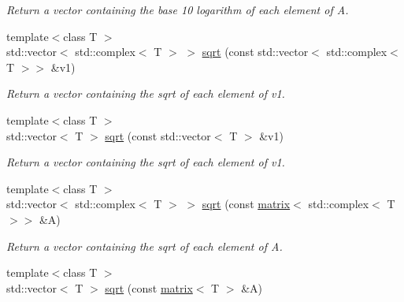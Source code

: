 \begin{DoxyCompactItemize}
\begin{DoxyCompactList}\small\item\em Return a vector containing the base 10 logarithm of each element of A. \end{DoxyCompactList}\item 
\hypertarget{namespacekeycpp_a24d916a516c57aad0e383ce29a50b963}{{\footnotesize template$<$class T $>$ }\\std\-::vector$<$ std\-::complex$<$ T $>$ $>$ \hyperlink{namespacekeycpp_a24d916a516c57aad0e383ce29a50b963}{sqrt} (const std\-::vector$<$ std\-::complex$<$ T $>$$>$ \&v1)}\label{namespacekeycpp_a24d916a516c57aad0e383ce29a50b963}

\begin{DoxyCompactList}\small\item\em Return a vector containing the sqrt of each element of v1. \end{DoxyCompactList}\item 
\hypertarget{namespacekeycpp_a8677ad8b7dc8485540330a632cb82994}{{\footnotesize template$<$class T $>$ }\\std\-::vector$<$ T $>$ \hyperlink{namespacekeycpp_a8677ad8b7dc8485540330a632cb82994}{sqrt} (const std\-::vector$<$ T $>$ \&v1)}\label{namespacekeycpp_a8677ad8b7dc8485540330a632cb82994}

\begin{DoxyCompactList}\small\item\em Return a vector containing the sqrt of each element of v1. \end{DoxyCompactList}\item 
\hypertarget{namespacekeycpp_a2955a17019e584c29d9cce73ea572adc}{{\footnotesize template$<$class T $>$ }\\std\-::vector$<$ std\-::complex$<$ T $>$ $>$ \hyperlink{namespacekeycpp_a2955a17019e584c29d9cce73ea572adc}{sqrt} (const \hyperlink{classkeycpp_1_1matrix}{matrix}$<$ std\-::complex$<$ T $>$$>$ \&A)}\label{namespacekeycpp_a2955a17019e584c29d9cce73ea572adc}

\begin{DoxyCompactList}\small\item\em Return a vector containing the sqrt of each element of A. \end{DoxyCompactList}\item 
\hypertarget{namespacekeycpp_ab542118d6ab4772a4f100df097f7d55d}{{\footnotesize template$<$class T $>$ }\\std\-::vector$<$ T $>$ \hyperlink{namespacekeycpp_ab542118d6ab4772a4f100df097f7d55d}{sqrt} (const \hyperlink{classkeycpp_1_1matrix}{matrix}$<$ T $>$ \&A)}\label{namespacekeycpp_ab542118d6ab4772a4f100df097f7d55d}


\end{DoxyCompactItemize}
